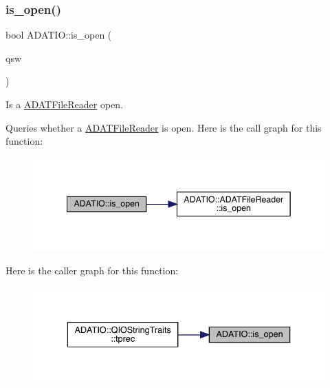 \subsubsection{\texorpdfstring{is\_open()}{is\_open()}\hspace{0.1cm}{\footnotesize\ttfamily [2/2]}}
{\footnotesize\ttfamily bool A\+D\+A\+T\+I\+O\+::is\+\_\+open (\begin{DoxyParamCaption}\item[{\mbox{\hyperlink{classADATIO_1_1ADATFileReader}{A\+D\+A\+T\+File\+Reader}} \&}]{qsw }\end{DoxyParamCaption})}



Is a \mbox{\hyperlink{classADATIO_1_1ADATFileReader}{A\+D\+A\+T\+File\+Reader}} open. 

Queries whether a \mbox{\hyperlink{classADATIO_1_1ADATFileReader}{A\+D\+A\+T\+File\+Reader}} is open. Here is the call graph for this function\+:
\nopagebreak
\begin{figure}[H]
\begin{center}
\leavevmode
\includegraphics[width=342pt]{db/de5/group__qio_gad9b8cab72f011dd46c24a51e8a1c756a_cgraph}
\end{center}
\end{figure}
Here is the caller graph for this function\+:\nopagebreak
\begin{figure}[H]
\begin{center}
\leavevmode
\includegraphics[width=336pt]{db/de5/group__qio_gad9b8cab72f011dd46c24a51e8a1c756a_icgraph}
\end{center}
\end{figure}
\mbox{\label{group__qio_ga3498ab9948d446056dee8f2808e05c78}} 
